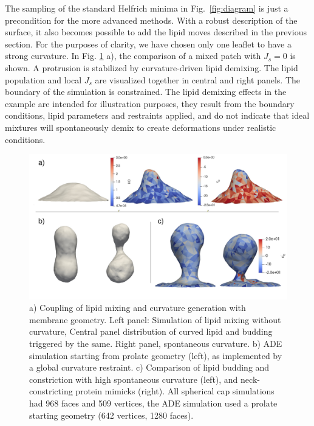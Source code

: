 \documentclass[twocolumn]{biophys-new}
\begin{document}
The sampling of the standard Helfrich minima in Fig.~\ref{fig:diagram} is just a precondition for the more advanced methods. With a robust description of the surface, it also becomes possible to add the lipid moves described in the previous section. For the purposes of clarity, we have chosen only one leaflet to have a strong curvature. In Fig. \ref{fig:examples} a), the comparison of a mixed patch with $J_s = 0$ is shown. A protrusion is stabilized by curvature-driven lipid demixing. 
The lipid population and local $J_s$ are visualized together in central and right panels. The boundary of the simulation is constrained. The lipid demixing effects in the example are intended for illustration purposes,
they result from the boundary conditions, lipid parameters and restraints applied, and do not indicate that ideal mixtures will spontaneously demix to create
deformations under realistic conditions.

\begin{figure}[hbt]
\centering
\includegraphics[width=\linewidth]{fig/Fig_exmp_upd2}
\caption{a) Coupling of lipid mixing and curvature generation with membrane geometry. Left panel: Simulation of lipid mixing without curvature, Central panel distribution of curved lipid and budding triggered by the same. Right panel, spontaneous curvature. b) ADE simulation starting from prolate geometry (left), as implemented by a global curvature restraint. c) Comparison of lipid budding and constriction with high spontaneous curvature (left), and neck-constricting protein mimicks (right). All spherical cap simulations had 968 faces and 509 vertices, the ADE simulation used a prolate starting geometry (642 vertices, 1280 faces).}
\label{fig:examples}
\end{figure}
\end{document}
